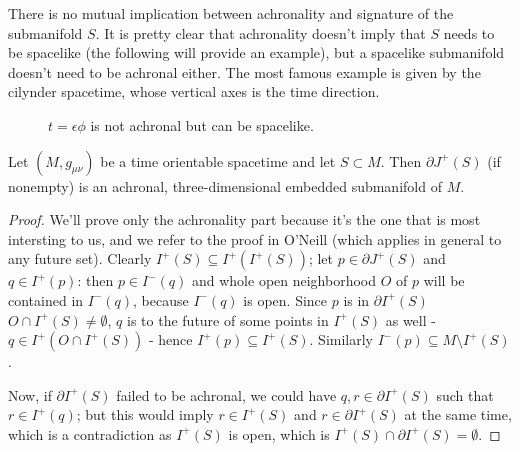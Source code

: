 \begin{remark}
	There is no mutual implication between achronality and signature of the submanifold \(S\).
	It is pretty clear that achronality doesn't imply that \(S\) needs to be spacelike (the following will provide an example), but a spacelike submanifold doesn't need to be achronal either. The most famous example is given by the cilynder spacetime, whose vertical axes is the time direction.

	\begin{figure}
	\centering
	\caption{\(t = \epsilon\phi\) is not achronal but can be spacelike.}
\end{figure}

\end{remark}

\begin{theorem}
	Let \((M, g_{\mu\nu})\) be a time orientable spacetime and let \(S\subset M\). Then \(\partial J^+(S)\) (if nonempty) is an achronal, three-dimensional embedded submanifold of \(M\).
\end{theorem}
\begin{proof}
	We'll prove only the achronality part because it's the one that is most intersting to 
	us, and we refer to the proof in O'Neill \cite{o1983semi} (which applies in general 
	to any future set). Clearly \(I^+(S) \subseteq I^+(I^+(S))\); 
	let \(p\in \partial J^+(S)\) and \(q \in I^+(p)\): then \(p \in I^-(q)\) and 
	whole open neighborhood \(O\)  of \(p\) will be contained in \(I^-(q)\), 
	because \(I^-(q)\) is open. 
	Since \(p\) is in \(\partial I^+(S)\) \(O \cap I^+(S) \neq \emptyset\), \(q\) 
	is to the future of some points in \(I^+(S)\) as well - \(q \in I^+(O \cap I^+(S)) \) -
	 hence \(I^+(p) \subseteq I^+(S)\). 
	 Similarly \(I^-(p) \subseteq M \setminus I^+(S)\).
	
	Now, if \(\partial I^+(S)\) failed to be achronal, we could have 
	\(q,r \in \partial I^+(S)\) such that \(r \in I^+(q)\); but this would imply 
	\(r \in I^+(S)\) and \(r \in \partial I^+(S)\) at the same time, which is a 
	contradiction as \(I^+(S)\) is open, which is 
	\(I^+(S) \cap \partial I^+(S) = \emptyset\).
\end{proof}

